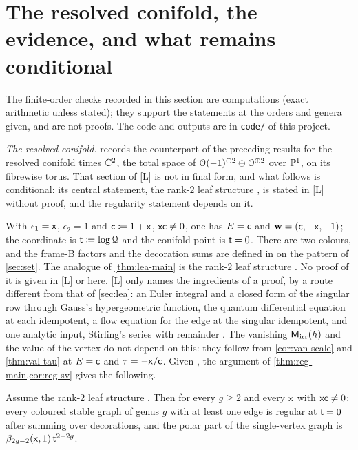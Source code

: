 \section{The resolved conifold, the evidence, and what remains conditional}
\label{sec:fin}
\noindent{} The finite-order checks recorded in this section are computations (exact arithmetic unless stated); they support the statements at the orders and genera given, and are not proofs. The code and outputs are in \texttt{code/} of this project.


\emph{The resolved conifold.}  records the counterpart of the preceding results for the resolved conifold times $\mathbb{C}^2$, the total space of $\mathcal{O}(-1)^{\oplus 2}\oplus\mathcal{O}^{\oplus 2}$ over $\mathbb{P}^1$, on its fibrewise torus. That section of \textup{[L]} is not in final form, and what follows is conditional: its central statement, the rank-$2$ leaf structure , is stated in \textup{[L]} without proof, and the regularity statement  depends on it.

With $\epsilon_1=\mathsf{x}$, $\epsilon_2=1$ and $\mathsf{c}\coloneqq1+\mathsf{x}$, $\mathsf{x}\mathsf{c}\neq0$, one has $E=\mathsf{c}$ and $\mathbf{w}=(\mathsf{c},-\mathsf{x},-1)$; the coordinate is $\mathsf{t}\coloneqq\log\mathcal{Q}$ and the conifold point is $\mathsf{t}=0$. There are two colours, and the frame-B factors and the decoration sums are defined in  on the pattern of \cref{sec:set}. The analogue of \cref{thm:lea-main} is the rank-$2$ leaf structure . No proof of it is given in \textup{[L]} or here. \textup{[L]} only names the ingredients of a proof, by a route different from that of \cref{sec:lea}: an Euler integral and a closed form of the singular row through Gauss's hypergeometric function, the quantum differential equation at each idempotent, a flow equation for the edge at the singular idempotent, and one analytic input, Stirling's series with remainder \cite[5.11.1, Section~5.11(ii)]{DLMF}. The vanishing $\mathsf{M}_{\mathrm{irr}}(h)$ and the value of the vertex do not depend on this: they follow from \cref{cor:van-scale} and \cref{thm:val-tau} at $E=\mathsf{c}$ and $\tau=-\mathsf{x}/\mathsf{c}$. Given , the argument of \cref{thm:reg-main,cor:reg-sv} gives the following.

\begin{cor}
\label{cor:con-reg}
Assume the rank-$2$ leaf structure . Then for every $g\geq 2$ and every $\mathsf{x}$ with $\mathsf{x}\mathsf{c}\neq 0$: every coloured stable graph of genus $g$ with at least one edge is regular at $\mathsf{t}=0$ after summing over decorations, and the polar part of the single-vertex graph is $\beta_{2g-2}(\mathsf{x},1)\,\mathsf{t}^{2-2g}$.
\end{cor}

